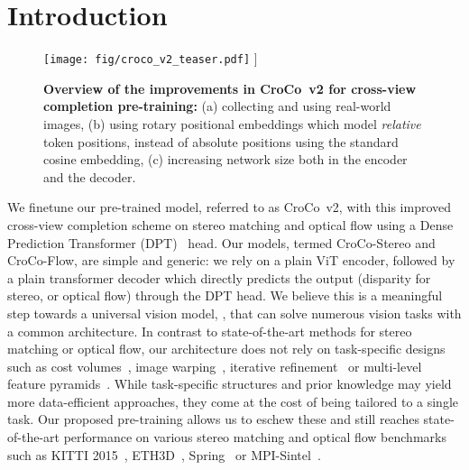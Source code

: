 \documentclass[10pt,twocolumn,letterpaper]{article}
\newcommand{\croconew}{CroCo~v2\xspace}
\newcommand{\ours}{CroCo-Stereo\xspace}
\newcommand{\oursflow}{CroCo-Flow\xspace}
\begin{document}
\section{Introduction}
\label{sec:intro}

\begin{figure}
\texttt{[image: fig/croco\_v2\_teaser.pdf]} \-0.45cm]
\caption{\textbf{Overview of the improvements in \croconew for cross-view completion pre-training:} (a) collecting and using real-world images, (b) using rotary positional embeddings which model \textit{relative} token positions, instead of absolute positions using the standard cosine embedding, (c) increasing network size both in the encoder and the decoder.}
\label{fig:intro}
\vspace{-0.15cm}

\end{figure}


We finetune our pre-trained model, referred to as \croconew, with this improved cross-view completion scheme on stereo matching and optical flow using a Dense Prediction Transformer (DPT)~\cite{dpt} head. 
Our models, termed \ours and \oursflow, are simple and generic: 
we rely on a plain ViT encoder, followed by a plain transformer decoder which 
directly predicts the output (disparity for stereo, or optical flow) through the DPT head.
We believe this is a meaningful step towards a universal vision model, \ie, that can solve numerous vision tasks with a common architecture. In contrast to state-of-the-art methods for stereo matching or optical flow, our architecture does not rely on task-specific designs such as cost volumes~\cite{flowformer,jie2018left,gcnet,stereonet,yin2019hierarchical}, image warping~\cite{brox2004high,pwcnetplus}, iterative refinement~\cite{crestereo,raftstereo,raft} or multi-level feature pyramids~\cite{leastereo,crestereo,pwcnetplus}. While task-specific structures and prior knowledge may yield more data-efficient approaches, they come at the cost of being tailored to a single task. Our proposed pre-training allows us to eschew these and still reaches state-of-the-art performance on various stereo matching and optical flow benchmarks such as KITTI 2015~\cite{kitti15}, ETH3D~\cite{eth3d}, Spring~\cite{spring} or MPI-Sintel~\cite{sintel}.
\end{document}
